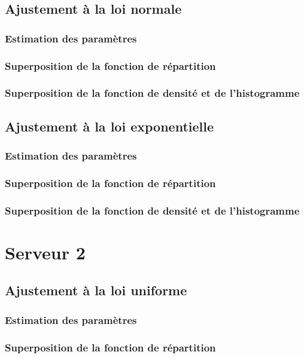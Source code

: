 \documentclass{article}
\begin{document}
\subsection{Ajustement à la loi normale}

\subsubsection{Estimation des paramètres}
\subsubsection{Superposition de la fonction de répartition}
\subsubsection{Superposition de la fonction de densité et de l'histogramme}

\subsection {Ajustement à la loi exponentielle}

\subsubsection{Estimation des paramètres}
\subsubsection{Superposition de la fonction de répartition}
\subsubsection{Superposition de la fonction de densité et de l'histogramme}

\section{Serveur 2}

\subsection{Ajustement à la loi uniforme}

\subsubsection{Estimation des paramètres}
\subsubsection{Superposition de la fonction de répartition}
\end{document}
